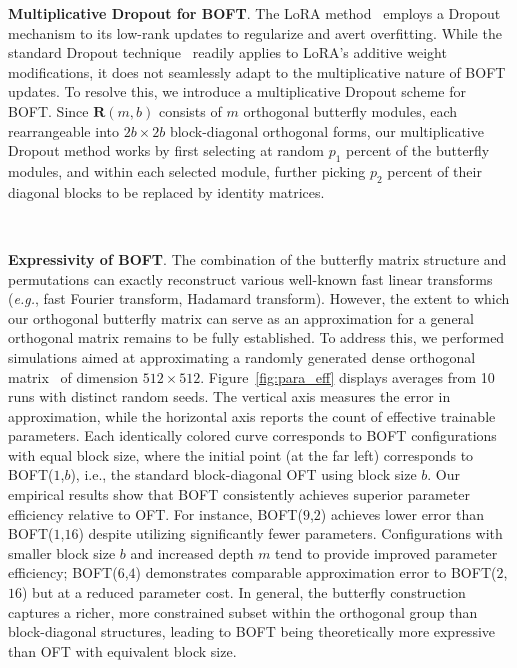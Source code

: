 \textbf{Multiplicative Dropout for BOFT}. The LoRA method~\cite{hulora2022} employs a Dropout mechanism to its low-rank updates to regularize and avert overfitting. While the standard Dropout technique~\cite{srivastava2014dropout} readily applies to LoRA's additive weight modifications, it does not seamlessly adapt to the multiplicative nature of BOFT updates. To resolve this, we introduce a multiplicative Dropout scheme for BOFT. Since $\bm{R}(m,b)$ consists of $m$ orthogonal butterfly modules, each rearrangeable into $2b\times 2b$ block-diagonal orthogonal forms, our multiplicative Dropout method works by first selecting at random $p_1$ percent of the butterfly modules, and within each selected module, further picking $p_2$ percent of their diagonal blocks to be replaced by identity matrices.

\

\textbf{Expressivity of BOFT}. The combination of the butterfly matrix structure and permutations can exactly reconstruct various well-known fast linear transforms~\cite{dao2019learning,dao2019kaleidoscope} (\emph{e.g.}, fast Fourier transform, Hadamard transform). However, the extent to which our orthogonal butterfly matrix can serve as an approximation for a general orthogonal matrix remains to be fully established. To address this, we performed simulations aimed at approximating a randomly generated dense orthogonal matrix~\cite{anderson1987generation} of dimension $512\times 512$. Figure~\ref{fig:para_eff} displays averages from 10 runs with distinct random seeds. The vertical axis measures the error in approximation, while the horizontal axis reports the count of effective trainable parameters. Each identically colored curve corresponds to BOFT configurations with equal block size, where the initial point (at the far left) corresponds to BOFT($1$,$b$), i.e., the standard block-diagonal OFT using block size $b$. Our empirical results show that BOFT consistently achieves superior parameter efficiency relative to OFT. For instance, BOFT($9$,$2$) achieves lower error than BOFT($1$,$16$) despite utilizing significantly fewer parameters. Configurations with smaller block size $b$ and increased depth $m$ tend to provide improved parameter efficiency; BOFT($6$,$4$) demonstrates comparable approximation error to BOFT($2$,$16$) but at a reduced parameter cost. In general, the butterfly construction captures a richer, more constrained subset within the orthogonal group than block-diagonal structures, leading to BOFT being theoretically more expressive than OFT with equivalent block size.

